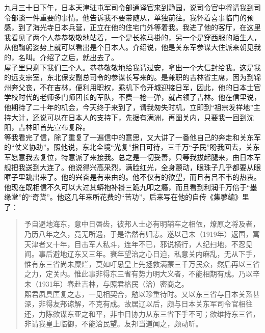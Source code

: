九月三十日下午，日本天津驻屯军司令部通译官来到静园，说司令官中将请我到司令部谈一件重要的事情。他告诉我不要带随从，单独前往。我怀着喜事临门的预感，到了海光寺日本兵营，正立在他的住宅门外等着我。我进了他的客厅，在这里我看见了两个人恭恭敬敬地站着，一个是长袍马褂的，另一个是穿西服的陌生人，从他鞠躬姿势上就可以看出是个日本人。介绍说，他是关东军参谋大住派来朝见我的，名叫。介绍了之后，就出去了。\\

屋子里只剩下我们三个人。恭恭敬敬地给我请过安，拿出一个大信封给我。这是我的远支宗室，东北保安副总司令的参谋长写来的。是兼职的吉林省主席，因为到锦州奔父丧，不在吉林，便利用职权，乘机下令开城迎接日军，因此，他的日本士官学校时代的老师多门师团长的军队，不费一枪一弹，就占领了吉林。他在信里说，他期待了二十年的机会，今天终于来到了，请我匆失时机，立即到“祖宗发祥地”主持大计，还说可以在日本人的支持下，先据有满洲，再图关内，只要我一回到沈阳，吉林即首先宣布复辟。\\

等我看完了信，除了重复了一遍信中的意思，又大讲了一番他自己的奔走和关东军的“仗义协助”。照他说，东北全境“光复”指日可待，三千万“子民”盼我回去，关东军愿意我去复位，特意派了来接我。总之是一切妥善，只等我拔起腿来，由日本军舰把我送到大连了。他说得兴高采烈，满脸红光，全身颤动，眼珠子几乎都要从眼眶子里跳出来了。他的兴奋是有来由的。他不仅有的欲望，而且有吕不韦的热衷。他现在既相信不久可以大过其蟒袍补褂三跪九叩之瘾，而且看到利润千万倍于“墨缘堂”的“奇货”。他这几年来所花费的“苦功”，后来写在他的自传《集蓼编》里了：\\

\begin{quote}
	予自避地海东，意中日唇齿，彼邦人士必有明辅车之相依，燎原之将及者，乃历八年之久，竟无所遇，于是浩然有归志。遂以己未（1919年）返国，寓天津者又十年，目击军人私斗，连年不已，邪说横行，人纪扫地，不忍见闻。事后避地辽东又三年。衰年望治之心日迫，私意关内麻乱，无从下手，惟有东三省尚未糜烂，莫如吁恳皇上先拯救满蒙三千万民众，然后再以三省之力，定关内。惟此事非得东三省有势力明大义者，不能相期有成。乃以辛未（1931年）春赴吉林，与照君格民（洽）密商之。\\

熙君夙具匡复之志，一见相契合，勉以珍重待时。又以东三省与日本关系甚深，非得友邦谅解，不克有成。故居辽以后，颇与日本关东军司令官相往还，力陈欲谋东亚之和平，非中日协力从东三省下手不可；欲维持东三省，非请我皇上临御，不能洽民望。友邦当道闻之，颇动听。\\
\end{quote}

